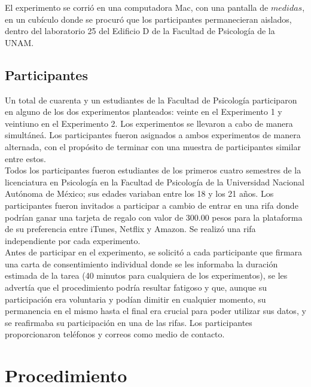 El experimento se corrió en una computadora Mac, con una pantalla de $medidas$, en un cubículo donde se procuró que los participantes permanecieran aislados, dentro del laboratorio 25 del Edificio D de la Facultad de Psicología de la UNAM.

\subsection{Participantes}

Un total de cuarenta y un estudiantes de la Facultad de Psicología participaron en alguno de los dos experimentos planteados: veinte en el Experimento 1 y veintiuno en el Experimento 2. Los experimentos se llevaron a cabo de manera simultáneá. Los participantes fueron asignados a ambos experimentos de manera alternada, con el propósito de terminar con una muestra de participantes similar entre estos.\\

Todos los participantes fueron estudiantes de los primeros cuatro semestres de la licenciatura en Psicología en la Facultad de Psicología de la Universidad Nacional Autónoma de México; sus edades variaban entre los 18 y los 21 años. Los participantes fueron invitados a participar a cambio de entrar en una rifa donde podrían ganar una tarjeta de regalo con valor de $300.00$ pesos para la plataforma de su preferencia entre iTunes, Netflix y Amazon. Se realizó una rifa independiente por cada experimento.\\ 

Antes de participar en el experimento, se solicitó a cada participante que firmara una carta de consentimiento individual donde se les informaba la duración estimada de la tarea (40 minutos para cualquiera de los experimentos), se les advertía que el procedimiento podría resultar fatigoso y que, aunque su participación era voluntaria y podían dimitir en cualquier momento, su permanencia en el mismo hasta el final era crucial para poder utilizar sus datos, y se reafirmaba su participación en una de las rifas. Los participantes proporcionaron teléfonos y correos como medio de contacto.\\

\section{Procedimiento}

